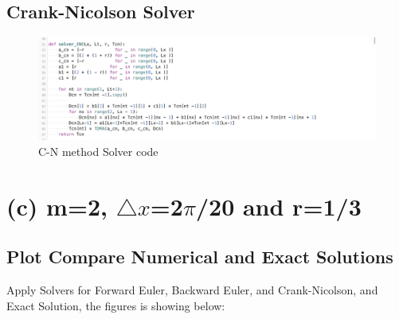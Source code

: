 \documentclass[12pt]{article}
\begin{document}
\subsection{Crank-Nicolson Solver}


\begin{figure}[H] 
\centering 
\includegraphics[scale=0.25]{C-N method Solver.jpg} 
\caption{C-N method Solver code} 
\label{TDMA Solver code} 
\end{figure}















\section{(c) m=2, $\triangle x$=2$\pi$/20 and r=1/3}
\subsection{Plot Compare Numerical and Exact Solutions}
Apply Solvers for Forward Euler, Backward Euler, and Crank-Nicolson, and Exact Solution, the figures is showing below:
\end{document}
